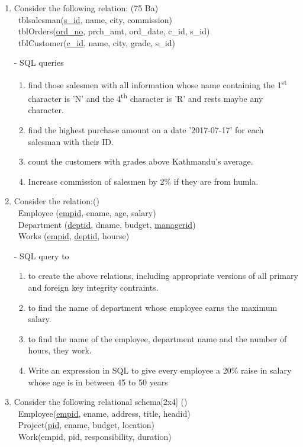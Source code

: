 \documentclass[12pt]{article}
\newcommand{\enter}{\\\textcolor{white}{1}}
\begin{document}
\begin{enumerate}
    \item Consider the following relation: \hfill (75 Ba)
        \enter tblsalesman(\underline{s\_id}, name, city, commission)
        \enter tblOrders(\underline{ord\_no}, prch\_amt, ord\_date, c\_id, s\_id)
        \enter tblCustomer(\underline{c\_id}, name, city, grade, s\_id)

        - SQL queries
        \begin{enumerate}[noitemsep, topsep = 0pt, label = \alph*.]
            \item find those salesmen with all information whose name containing the 1\textsuperscript{st} character is 'N' and the 4\textsuperscript{th} character is 'R' and rests maybe any character.
            \item find the highest purchase amount on a date '2017-07-17' for each salesman with their ID.
            \item count the customers with grades above Kathmandu's average.
            \item Increase commission of salesmen by 2\% if they are from humla.
        \end{enumerate}

    \item Consider the relation:\hfill ()
        \enter Employee (\underline{empid}, ename, age, salary)
        \enter Department (\underline{deptid}, dname, budget, \underline{managerid})
        \enter Works (\underline{empid}, \underline{deptid}, hourse)

        - SQL query to
        \begin{enumerate}[noitemsep, topsep = 0pt, label = \alph*.]
            \item to create the above relations, including appropriate versions of all primary and foreign key integrity contraints.
            \item to find the name of department whose employee earns the maximum salary.
            \item to find the name of the employee, department name and the number of hours, they work.
            \item Write an expression in SQL to give every employee a 20\% raise in salary whose age is in between 45 to 50 years
        \end{enumerate}

    \item Consider the following relational schema\hfill[2x4] ()
        \enter Employee(\underline{empid}, ename, address, title, headid)
        \enter Project(\underline{pid}, ename, budget, location)
        \enter Work(empid, pid, responsibility, duration)
        

\end{enumerate}
\end{document}
